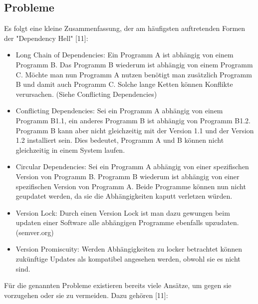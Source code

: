 \subsection{Probleme}
Es folgt eine kleine Zusammenfassung, der am häufigsten auftretenden Formen der "Dependency Hell" [11]:
\begin{itemize}
 \item Long Chain of Dependencies: Ein Programm A ist abhängig von einem Programm B. Das Programm B wiederum ist abhängig von einem Programm C.
Möchte man nun Programm  A nutzen benötigt man zusätzlich Programm  B und damit auch Programm C. Solche lange Ketten können Konflikte verursachen.
(Siehe Conflicting Dependencies)
\item Conflicting Dependencies: Sei ein Programm A abhängig von einem Programm B1.1, ein anderes Programm B ist abhängig von  Programm B1.2. Programm B 
kann aber nicht gleichzeitig mit der Version 1.1 und der Version 1.2 installiert sein. Dies bedeutet, Programm A und B können nicht gleichzeitig in einem System laufen.
\item Circular Dependencies: Sei ein Programm A abhängig von einer spezifischen Version von Programm B. Programm B wiederum ist abhängig von einer spezifischen
Version von Programm A. Beide Programme können nun nicht geupdatet werden, da sie die Abhängigkeiten kaputt verletzen würden.
\item Version Lock: Durch einen Version Lock ist man dazu gewungen beim updaten einer Software alle abhängigen Programme ebenfalls upzudaten. (semver.org)
\item Version Promiscuity: Werden Abhängigkeiten zu locker betrachtet können zukünftige Updates als kompatibel angesehen werden, obwohl sie es nicht sind.
\end{itemize}

Für die genannten Probleme existieren bereits viele Ansätze, um gegen sie vorzugehen oder sie zu vermeiden. Dazu gehören [11]:

